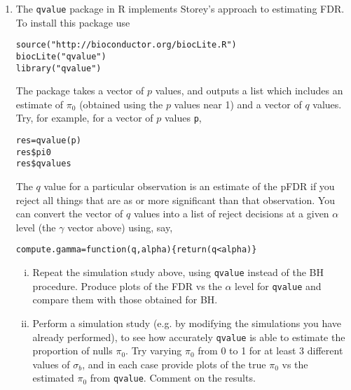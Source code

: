 \documentclass[12pt]{article}
\begin{document}
\begin{enumerate}
\item The {\tt qvalue} package in R implements Storey's approach to estimating FDR. To install this package use
\begin{verbatim}
source("http://bioconductor.org/biocLite.R")
biocLite("qvalue")
library("qvalue")
\end{verbatim}
The package takes a vector of $p$ values, and outputs a list which includes an estimate of $\pi_0$ (obtained
using the $p$ values near 1) and a vector of $q$ values.  Try, for example, for a vector of $p$ values {\tt p},
\begin{verbatim}
res=qvalue(p)
res$pi0
res$qvalues
\end{verbatim}

The $q$ value for a particular observation is an estimate of the pFDR 
if you reject all things that are as or more significant than that observation.
You can convert the vector of $q$ values into a list of reject decisions at a given $\alpha$ level (the $\gamma$ vector above) 
using, say,
\begin{verbatim}
compute.gamma=function(q,alpha){return(q<alpha)}
\end{verbatim}

\begin{enumerate}[i)]
\item Repeat the simulation study above, using {\tt qvalue} instead of the BH procedure. Produce plots of the FDR vs the $\alpha$
level for {\tt qvalue} and compare them with those obtained for BH.
\item Perform a simulation study (e.g. by modifying the simulations you have already performed), to see how accurately {\tt qvalue} is able to estimate the
proportion of nulls $\pi_0$. Try varying  $\pi_0$ from 0 to 1 for at least 3 different values of $\sigma_b$, and in each case provide plots of the true $\pi_0$ vs
the estimated $\pi_0$ from {\tt qvalue}. Comment on the results.
\end{enumerate}




\end{enumerate}
\end{document}

